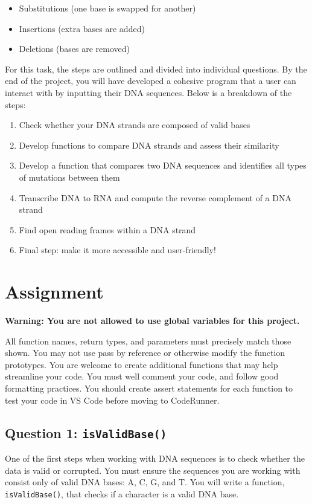 \begin{itemize}[left=1cm]
    \item Substitutions (one base is swapped for another)
    \item Insertions (extra bases are added)
    \item Deletions (bases are removed)
\end{itemize}

For this task, the steps are outlined and divided into individual questions. By the end of the project, you will have developed a cohesive program that a user can interact with by inputting their DNA sequences. Below is a breakdown of the steps: 

\begin{enumerate}[left=1cm]
    \item Check whether your DNA strands are composed of valid bases
    \item Develop functions to compare DNA strands and assess their similarity
    \item Develop a function that compares two DNA sequences and identifies all types of mutations between them
    \item Transcribe DNA to RNA and compute the reverse complement of a DNA strand
    \item Find open reading frames within a DNA strand
    \item Final step:  make it more accessible and user-friendly!
    
\end{enumerate}


\section{Assignment}

\textbf{Warning: You are not allowed to use global variables for this project.}

All function names, return types, and parameters must precisely match those shown. You may not use pass by reference or otherwise modify the function prototypes. You are welcome to create additional functions that may help streamline your code. You must well comment your code, and follow good formatting practices. You should create assert statements for each function to test your code in VS Code before moving to CodeRunner.

\subsection{Question 1: \texttt{isValidBase()}}
One of the first steps when working with DNA sequences is to check whether the data is valid or corrupted. You must ensure the sequences you are working with consist only of valid DNA bases: A, C, G, and T. You will write a function, \texttt{isValidBase()}, that checks if a character is a valid DNA base.

